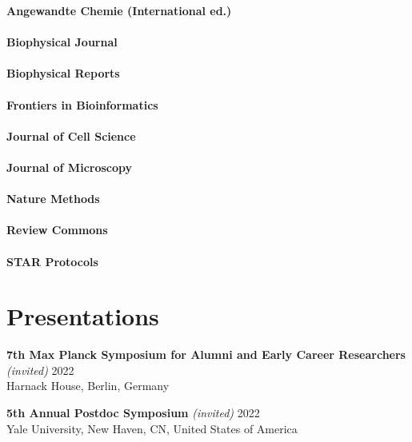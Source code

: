 \documentclass[margin,line]{res}
\begin{document}
\begin{resume}
{\bf   Angewandte Chemie (International ed.)} \\
\vspace*{-3mm}\\
{\bf   Biophysical Journal}\\
\vspace*{-3mm}\\
{\bf   Biophysical Reports}\\
\vspace*{-3mm}\\
{\bf   Frontiers in Bioinformatics }\\
\vspace*{-3mm}\\
{\bf   Journal of Cell Science}\\
\vspace*{-3mm}\\
{\bf  Journal of Microscopy}\\
\vspace*{-3mm}\\
{\bf    Nature Methods}\\
\vspace*{-3mm}\\
{\bf    Review Commons}\\
\vspace*{-3mm}\\
{\bf    STAR Protocols}\\


\section{\sc  Presentations}

{\bf  7th Max Planck Symposium for Alumni and Early Career Researchers}  {\it (invited)} \hfill 2022\\
Harnack House, Berlin, Germany%

\vspace*{-2.5mm}
{\bf  5th Annual Postdoc Symposium}  {\it (invited)} \hfill 2022\\
Yale University, New Haven, CN, United States of America %


\end{resume}
\end{document}
